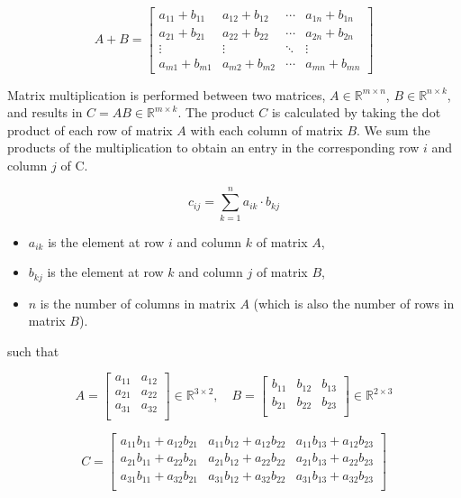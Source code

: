 \documentclass{report}
\begin{document}
\[ A + B = \begin{bmatrix}
a_{11} + b_{11} & a_{12} + b_{12} & \cdots & a_{1n} + b_{1n} \\
a_{21} + b_{21} & a_{22} + b_{22} & \cdots & a_{2n} + b_{2n} \\
\vdots & \vdots & \ddots & \vdots \\
a_{m1} + b_{m1} & a_{m2} + b_{m2} & \cdots & a_{mn} + b_{mn}
\end{bmatrix} \]


\noindent Matrix multiplication is performed between two matrices, $A \in \mathbb{R}^{m\times n}$, $B \in \mathbb{R}^{n \times k}$, and results in $C = AB \in \mathbb{R}^{m \times k}$. The product \( C \) is calculated by taking the dot product of each row of matrix \( A \) with each column of matrix \( B \). We sum the products of the multiplication to obtain an entry in the corresponding row $i$ and column $j$ of C.

\[ c_{ij} = \sum_{k=1}^{n} a_{ik} \cdot b_{kj} \] 
\begin{itemize}
    \item $a_{ik}$ is the element at row $i$ and column $k$ of matrix $A$,
    \item $b_{kj}$ is the element at row $k$ and column $j$ of matrix $B$,
    \item $n$ is the number of columns in matrix $A$ (which is also the number of rows in matrix $B$).
\end{itemize}
such that

\[ A = \begin{bmatrix} 
a_{11} & a_{12} \\
a_{21} & a_{22} \\
a_{31} & a_{32} \\
\end{bmatrix} \in \mathbb{R}^{3 \times 2}, \quad
B = \begin{bmatrix} 
b_{11} & b_{12} & b_{13} \\
b_{21} & b_{22} & b_{23} \\
\end{bmatrix} \in \mathbb{R}^{2 \times 3}\]

\[ C = \begin{bmatrix} 
a_{11}b_{11} + a_{12}b_{21} & a_{11}b_{12} + a_{12}b_{22} & a_{11}b_{13} + a_{12}b_{23} \\
a_{21}b_{11} + a_{22}b_{21} & a_{21}b_{12} + a_{22}b_{22} & a_{21}b_{13} + a_{22}b_{23} \\
a_{31}b_{11} + a_{32}b_{21} & a_{31}b_{12} + a_{32}b_{22} & a_{31}b_{13} + a_{32}b_{23} \\
\end{bmatrix} \]
\end{document}

